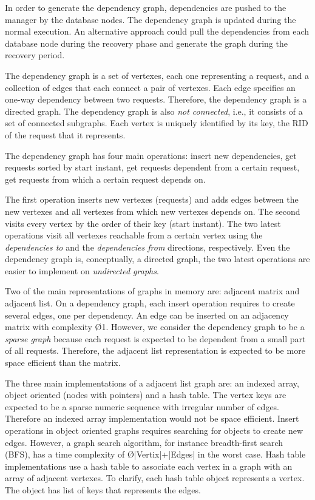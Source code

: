 In order to generate the dependency graph, dependencies are pushed to the manager by the database nodes. The dependency graph is updated during the normal execution. An alternative approach could pull the dependencies from each database node during the recovery phase and generate the graph during the recovery period.

The dependency graph is a set of vertexes, each one representing a request, and a collection of edges that each connect a pair of vertexes. Each edge specifies an one-way dependency between two requests. Therefore, the dependency graph is a directed graph. The dependency graph is also \emph{not connected}, i.e., it consists of a set of connected subgraphs. Each vertex is uniquely identified by its key, the \ac{RID} of the request that it represents. 


The dependency graph has four main operations: insert new dependencies, get requests sorted by start instant, get requests dependent from a certain request, get requests from which a certain request depends on.

The first operation inserts new vertexes (requests) and adds edges between the new vertexes and all vertexes from which new vertexes depends on. The second visits every vertex by the order of their key (start instant). The two latest operations visit all vertexes reachable from a certain vertex using the \emph{dependencies to} and the \emph{dependencies from} directions, respectively. Even the dependency graph is, conceptually, a directed graph, the two latest operations are easier to implement on \emph{undirected graphs}.

Two of the main representations of graphs in memory are: adjacent matrix and adjacent list. On a dependency graph, each insert operation requires to create several edges, one per dependency. An edge can be inserted on an adjacency matrix with complexity \O{1}. However, we consider the dependency graph to be a \emph{sparse graph} because each request is expected to be dependent from a small part of all requests. Therefore, the adjacent list representation is expected to be more space efficient than the matrix.

The three main implementations of a adjacent list graph are: an indexed array, object oriented (nodes with pointers) and a hash table. The vertex keys are expected to be a sparse numeric sequence with irregular number of edges. Therefore an indexed array implementation would not be space efficient. Insert operations in object oriented graphs requires searching for objects to create new edges. However, a graph search algorithm, for instance breadth-first search (BFS), has a time complexity of \O{|Vertix|+|Edges|} in the worst case.
Hash table implementations use a hash table to associate each vertex in a graph with an array of adjacent vertexes. To clarify, each hash table object represents a vertex. The object has list of keys that represents the edges. \\

